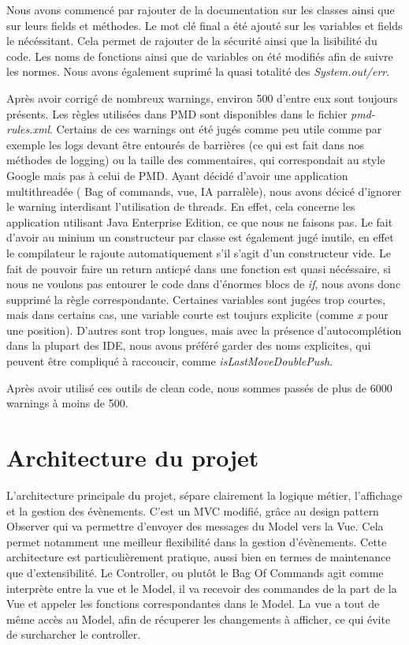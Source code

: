 \documentclass{article}
\begin{document}
Nous avons commencé par rajouter de la documentation sur les classes ainsi que sur leurs fields et méthodes. 
Le mot clé final a été ajouté sur les variables et fields le nécéssitant. Cela permet de rajouter de la sécurité ainsi que la lisibilité du code.
Les noms de fonctions ainsi que de variables on été modifiés afin de suivre les normes. Nous avons également suprimé la quasi totalité des \textit{System.out/err}.

Après avoir corrigé de nombreux warnings, environ 500 d'entre eux sont toujours présents.
Les règles utilisées dans PMD sont disponibles dans le fichier \textit{pmd-rules.xml}.
Certains de ces warnings ont été jugés 
comme peu utile comme par exemple les logs devant être entourés de barrières (ce qui est fait dans nos méthodes de logging) ou la taille des commentaires,
qui correspondait au style Google mais pas à celui de PMD. 
Ayant décidé d'avoir une application multithreadée ( Bag of commands, vue, IA parralèle), nous avons décicé d'ignorer le warning interdisant l'utilisation de threads.
En effet, cela concerne les application utilisant Java Enterprise Edition, ce que nous ne faisons pas.
Le fait d'avoir au minium un constructeur par classe est également jugé inutile, en effet le compilateur le rajoute automatiquement s'il s'agit d'un constructeur vide.
Le fait de pouvoir faire un return anticpé dans une fonction est quasi nécéssaire, si nous ne voulons pas entourer le code dans 
d'énormes blocs de \textit{if}, nous avons donc supprimé la règle correspondante.
Certaines variables sont jugées trop courtes, mais dans certains cas, une variable courte est toujurs explicite (comme \textit{x} pour une position). 
D'autres sont trop longues, mais avec la présence d'autocomplétion dans la plupart des IDE, nous avons préféré garder des noms explicites, qui peuvent être compliqué à raccoucir,
comme \textit{isLastMoveDoublePush}.

Après avoir utilisé ces outils de clean code, nous sommes passés de plus de 6000 warnings à moins de 500.

\section{Architecture du projet}
L'architecture principale du projet, sépare clairement la logique métier, l'affichage et la gestion des évènements. C'est un MVC modifié,
grâce au design pattern Observer qui va permettre d'envoyer des messages du Model vers la Vue. Cela permet notamment une meilleur flexibilité dans la
gestion d'évènements.
Cette architecture est particulièrement pratique, aussi bien en termes de maintenance que d'extensibilité.
Le Controller, ou plutôt le Bag Of Commands agit comme interprète entre la vue et le Model, il va recevoir des commandes de la part de la Vue et appeler les fonctions correspondantes dans le Model.
La vue a tout de même accès au Model, afin de récuperer les changements à afficher, ce qui évite de surcharcher le controller.
\end{document}
